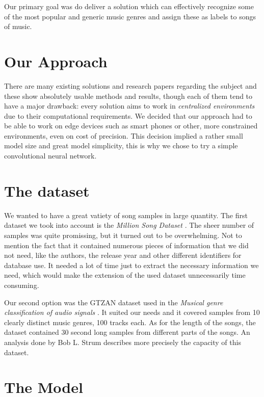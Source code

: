 \documentclass{article}
\begin{document}
    Our primary goal was do deliver a solution which can effectively recognize some of the
    most popular and generic music genres and assign these as labels to songs of music.

    \section{Our Approach}

    There are many existing solutions and research papers regarding the subject and these
    show absolutely usable methods and results, though each of them tend to have a major
    drawback: every solution aims to work in \emph{centralized environments} due to their
    computational requirements. We decided that our approach had to be able to work on
    edge devices such as smart phones or other, more constrained environments, even on
    cost of precision. This decision implied a rather small model size and great model
    simplicity, this is why we chose to try a simple convolutional neural network.

	\section{The dataset}

	We wanted to have a great vatiety of song samples in large quantity.
	The first dataset we took into account is the \textit{Million Song Dataset} \cite{million}.
	The sheer number of samples was quite promissing, but it turned out to be overwhelming.
	Not to mention the fact that it contained numerous pieces of information that we did not need, like the authors,
	the release year and other different identifiers for database use. 
	It needed a lot of time just to extract the necessary information we need, which would make the extension 
	of the used dataset unnecessarily time consuming. 


	Our second option was the GTZAN \cite{gtzan_art} dataset used in the \textit{Musical genre classification of audio signals} \cite{gtzan}.
	It suited our needs and it covered samples from 10 clearly distinct music genres, 100 tracks each.
	As for the length of the songs, the dataset contained 30 second long samples from different parts of the songs.
	An analysis done by Bob L. Strum \cite{gtzan_anal} describes more precisely the capacity of this dataset.

    \section{The Model}
\end{document}
